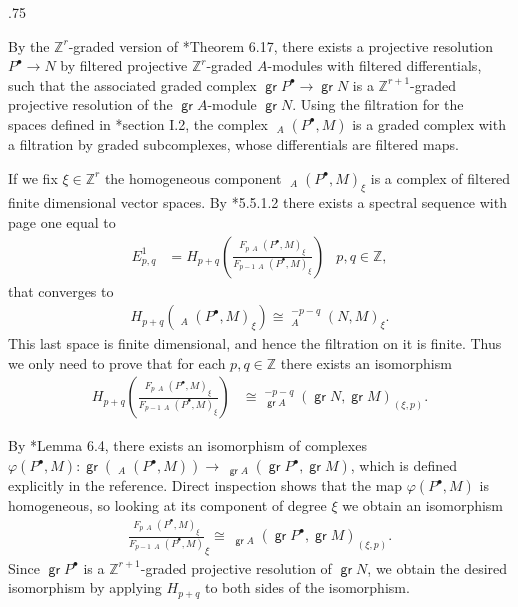\documentclass[11pt,fleqn]{article}
\makeatletter
\renewenvironment{proof}[1][\textit{Proof}]{\par
  \pushQED{\qed}%
  \normalfont \topsep.75\paraskip\relax
  \trivlist
  \item[\hskip\labelsep
        \itshape
    #1\@addpunct{.}]\ignorespaces
}{%
  \popQED\endtrivlist\@endpefalse
}
\newcommand\ZZ{\mathbb Z}
\renewcommand\to{\longrightarrow}
\renewcommand\phi{\varphi}
\DeclareMathOperator\GrHom{\underline{\mathsf{Hom}}}
\DeclareMathOperator\GrExt{\underline{\mathsf{Ext}}}
\DeclareMathOperator\gr{\mathsf{gr}}
\makeatother
\begin{document}
\begin{proof}
By the $\ZZ^r$-graded version of \cite{MR}*{Theorem 6.17}, there exists a projective
resolution $P^\bullet \to N$ by filtered projective $\ZZ^r$-graded $A$-modules with
filtered differentials, such that the associated graded complex $\gr P^\bullet \to \gr N$
is a $\ZZ^{r+1}$-graded projective resolution of the $\gr A$-module $\gr N$.
Using the filtration for the $\GrHom$ spaces defined in \cite{VO}*{section I.2}, the
complex $\GrHom_A(P^\bullet, M)$ is a graded complex with a filtration by graded
subcomplexes, whose differentials are filtered maps.

If we fix $\xi \in \ZZ^r$ the homogeneous component $\GrHom_A(P^\bullet, M)_\xi$ is a 
complex of filtered finite dimensional vector spaces. By \cite{W}*{5.5.1.2} there exists 
a spectral sequence with page one equal to
\begin{align*} 
	E_{p,q}^1 
	&= H_{p+q}\left(\frac{F_p \GrHom_A(P^\bullet,M)_\xi}
			{F_{p-1}	\GrHom_A(P^\bullet,M)_\xi}\right) 
		& p,q \in \ZZ,
\end{align*} 
that converges to 	
\begin{align*} 
	H_{p+q}(\GrHom_{A}(P^\bullet,M)_\xi) \cong \GrExt^{-p-q}_A(N,M)_\xi.
\end{align*}
This last space is finite dimensional, and hence the filtration on it is finite. Thus 
we only need to prove that for each $p,q \in \ZZ$ there exists an isomorphism
\begin{align*} 
	H_{p+q}\left(\frac{F_p \GrHom_A(P^\bullet,M)_\xi}{F_{p-1} \GrHom_A(P^\bullet,M)_\xi}
  \right) 
		&\cong \GrExt_{\gr A}^{-p-q}(\gr N, \gr M)_{(\xi,p)}.
\end{align*} 

By \cite{VO}*{Lemma 6.4}, there exists an isomorphism of complexes $\phi(P^\bullet, M):
\gr (\GrHom_A(P^\bullet, M)) \to \GrHom_{\gr A}(\gr P^\bullet, \gr M)$, which is defined
explicitly in the reference. Direct inspection shows that the map $\phi(P^\bullet, M)$ 
is homogeneous, so looking at its component of degree $\xi$ we obtain an isomorphism
\begin{align*}
\frac{F_p \GrHom_A(P^\bullet,M)_\xi}{F_{p-1} \GrHom_A(P^\bullet,M)}_\xi \cong 
\GrHom_{\gr A}(\gr P^\bullet, \gr M)_{(\xi,p)}.
\end{align*}
Since $\gr P^\bullet$ is a $\ZZ^{r+1}$-graded projective resolution of $\gr N$, we obtain
the desired isomorphism by applying $H_{p+q}$ to both sides of the isomorphism.
\end{proof}
\end{document}

